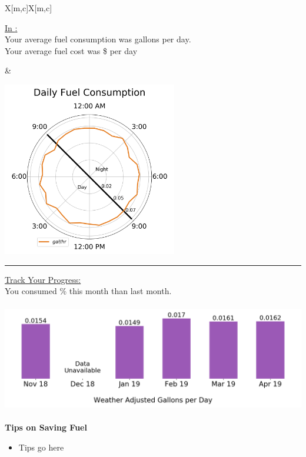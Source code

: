 \documentclass[12pt,a4paper]{article}
\begin{document}
\begin{tabu}{X[m,c]X[m,c]}

\begin{minipage}{\linewidth}
\underline{In {\reportmonth:}}\\

Your average fuel consumption was {\fuelperday} gallons per day.\\

Your average fuel cost was \${\fuelcostperday} per day\\
\end{minipage}

&

\begin{minipage}{\linewidth}
\includegraphics[height = 3in]{monthly_polar_plot.png}
\end{minipage}


\end{tabu}

\rule{\textwidth}{1pt}
\newline

\underline{Track Your Progress:}\\

You consumed {\progress}\% {\progressmoreless} this month than last month.\\
\begin{center}
\includegraphics[height= 1.875in]{monthly_track_your_progress.png}
\end{center}

\newpage
\renewcommand{\headsep}{14pt}
\fancyfoot{}
\begin{center}
\textbf{\Huge{Tips on Saving Fuel}}
\end{center}

\vspace{12pt}
\begin{itemize}
\item Tips go here
\end{itemize}
\end{document}
